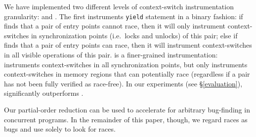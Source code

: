 We have implemented two different levels of context-switch instrumentation granularity: \yieldcoarse and \yieldmr.
%
The first instruments \texttt{yield} statement in a binary fashion: if \whoop
finds that a pair of entry points cannot race, then it will only instrument
context-switches in synchronization points (i.e.\ locks and unlocks) of this pair; else if \whoop finds
that a pair of entry points can race, then it will instrument context-switches
in all visible operations of this pair.
%
\textbf{\yieldmr} is a finer-grained instrumentation: \whoop instruments context-switches
in all synchronization points, but only instruments context-switches in memory
regions that can potentially race (regardless if a pair has not been fully
verified as race-free). In our experiments (see \S\ref{evaluation}),
\yieldmr significantly outperforms \yieldcoarse.

Our partial-order reduction can be used to accelerate \corral for arbitrary bug-finding in concurrent programs. In the remainder of this paper, though, we regard races as bugs and use \corral solely to look for races.
